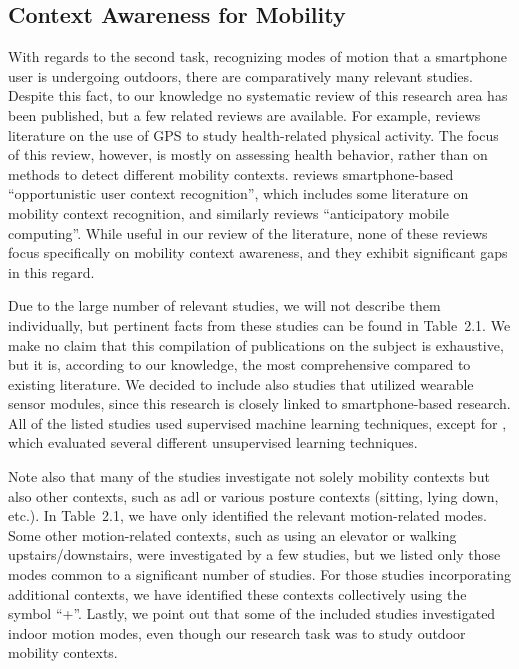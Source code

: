 \subsection{Context Awareness for Mobility}
\label{sec:mobility-context-literature}

With regards to the second task, recognizing modes of motion that a smartphone user is undergoing outdoors, there are comparatively many relevant studies. Despite this fact, to our knowledge no systematic review of this research area has been published, but a few related reviews are available. For example, \cite{Duncan2009} reviews literature on the use of GPS to study health-related physical activity. The focus of this review, however, is mostly on assessing health behavior, rather than on methods to detect different mobility contexts.  \cite{hoseini2013survey} reviews smartphone-based ``opportunistic user context recognition'', which includes some literature on mobility context recognition, and similarly \cite{pejovic2015anticipatory} reviews ``anticipatory mobile computing''. While useful in our review of the literature, none of these reviews focus specifically on mobility context awareness, and they exhibit significant gaps in this regard.

Due to the large number of relevant studies, we will not describe them individually, but pertinent facts from these studies can be found in Table~2.1. We make no claim that this compilation of publications on the subject is exhaustive, but it is, according to our knowledge, the most comprehensive compared to existing literature. We decided to include also studies that utilized wearable sensor modules, since this research is closely linked to smartphone-based research. All of the listed studies used supervised machine learning techniques, except for \cite{kwon2014unsupervised}, which evaluated several different unsupervised learning techniques.

Note also that many of the studies investigate not solely mobility contexts but also other contexts, such as \gls{adl} or various posture contexts (sitting, lying down, etc.). In Table~2.1, we have only identified the relevant motion-related modes. Some other motion-related contexts, such as using an elevator or walking upstairs/downstairs, were investigated by a few studies, but we listed only those modes common to a significant number of studies. For those studies incorporating additional contexts, we have identified these contexts collectively using the symbol ``+''. Lastly, we point out that some of the included studies investigated indoor motion modes, even though our research task was to study outdoor mobility contexts. 

